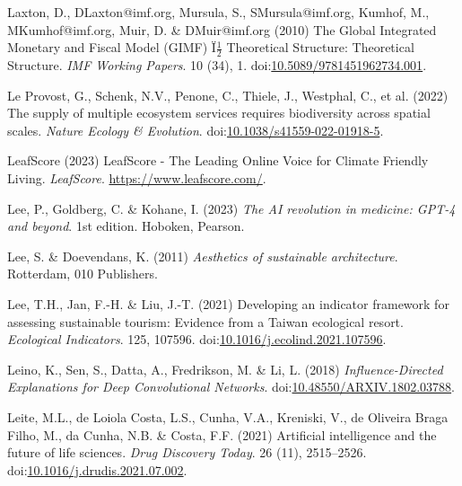 \documentclass[
  letterpaper,
  DIV=11,
  numbers=noendperiod]{scrartcl}
\newlength{\cslhangindent}
\newenvironment{CSLReferences}[2] %
 {\begin{list}{}{%
  \setlength{\itemindent}{0pt}
  \setlength{\leftmargin}{0pt}
  \setlength{\parsep}{0pt}
  \ifodd #1
   \setlength{\leftmargin}{\cslhangindent}
   \setlength{\itemindent}{-1\cslhangindent}
  \fi
  \setlength{\itemsep}{#2\baselineskip}}}
 {\end{list}}
\begin{document}
\begin{CSLReferences}{0}{1}
Laxton, D., DLaxton@imf.org, Mursula, S., SMursula@imf.org, Kumhof, M.,
MKumhof@imf.org, Muir, D. \& DMuir@imf.org (2010) The {Global Integrated
Monetary} and {Fiscal Model} ({GIMF})
{Ï}{\textquestiondown}{\(\frac{1}{2}\)} {Theoretical Structure}:
{Theoretical Structure}. \emph{IMF Working Papers}. 10 (34), 1.
doi:\href{https://doi.org/10.5089/9781451962734.001}{10.5089/9781451962734.001}.

Le Provost, G., Schenk, N.V., Penone, C., Thiele, J., Westphal, C., et
al. (2022) The supply of multiple ecosystem services requires
biodiversity across spatial scales. \emph{Nature Ecology \& Evolution}.
doi:\href{https://doi.org/10.1038/s41559-022-01918-5}{10.1038/s41559-022-01918-5}.

LeafScore (2023) {LeafScore} - {The Leading Online Voice} for {Climate
Friendly Living}. \emph{LeafScore}. \url{https://www.leafscore.com/}.

Lee, P., Goldberg, C. \& Kohane, I. (2023) \emph{The {AI} revolution in
medicine: {GPT-4} and beyond}. 1st edition. Hoboken, Pearson.

Lee, S. \& Doevendans, K. (2011) \emph{Aesthetics of sustainable
architecture}. Rotterdam, 010 Publishers.

Lee, T.H., Jan, F.-H. \& Liu, J.-T. (2021) Developing an indicator
framework for assessing sustainable tourism: {Evidence} from a {Taiwan}
ecological resort. \emph{Ecological Indicators}. 125, 107596.
doi:\href{https://doi.org/10.1016/j.ecolind.2021.107596}{10.1016/j.ecolind.2021.107596}.

Leino, K., Sen, S., Datta, A., Fredrikson, M. \& Li, L. (2018)
\emph{Influence-{Directed Explanations} for {Deep Convolutional
Networks}}.
doi:\href{https://doi.org/10.48550/ARXIV.1802.03788}{10.48550/ARXIV.1802.03788}.

Leite, M.L., de Loiola Costa, L.S., Cunha, V.A., Kreniski, V., de
Oliveira Braga Filho, M., da Cunha, N.B. \& Costa, F.F. (2021)
Artificial intelligence and the future of life sciences. \emph{Drug
Discovery Today}. 26 (11), 2515--2526.
doi:\href{https://doi.org/10.1016/j.drudis.2021.07.002}{10.1016/j.drudis.2021.07.002}.


\end{CSLReferences}
\end{document}
